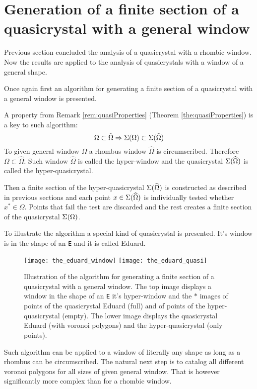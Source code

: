 \documentclass[text.tex]{subfiles}
\begin{document}
\pagestyle{plain}
\section{Generation of a finite section of a quasicrystal with a general window}
Previous section concluded the analysis of a quasicrystal with a rhombic window. Now the results are applied to the analysis of quasicrystals with a window of a general shape. 

Once again first an algorithm for generating a finite section of a quasicrystal with a general window is presented.

A property from Remark \ref{rem:quasiProperties} (Theorem \ref{the:quasiProperties}) is a key to such algorithm:
$$\Omega \subset \tilde{\Omega} \Rightarrow \Sigma(\Omega) \subset \Sigma(\tilde{\Omega})$$
To given general window $\Omega$ a rhombus window $\widehat{\Omega}$ is circumscribed. Therefore $\Omega\subset\widehat{\Omega}$. Such window $\widehat{\Omega}$ is called the hyper-window and the quasicrystal $\Sigma(\widehat{\Omega})$ is called the hyper-quasicrystal. 

Then a finite section of the hyper-quasicrystal $\Sigma(\widehat{\Omega})$ is constructed as described in previous sections and each point $x\in\Sigma(\widehat{\Omega})$ is individually tested whether $x^\ast\in\Omega$. Points that fail the test are discarded and the rest creates a finite section of the quasicrystal $\Sigma(\Omega)$.

To illustrate the algorithm a special kind of quasicrystal is presented. It's window is in the shape of an \texttt{E} and it is called Eduard.
\begin{figure}[h!]
\centering
\texttt{[image: the\_eduard\_window]}
\texttt{[image: the\_eduard\_quasi]}
\caption{Illustration of the algorithm for generating a finite section of a quasicrystal with a general window. The top image displays a window in the shape of an \texttt{E} it's hyper-window and the $\ast$ images of points of the quasicrystal Eduard (full) and of points of the hyper-quasicrystal (empty). The lower image displays the quasicrystal Eduard (with voronoi polygons) and the hyper-quasicrystal (only points).}
\end{figure}

Such algorithm can be applied to a window of literally any shape as long as a rhombus can be circumscribed. The natural next step is to catalog all different voronoi polygons for all sizes of given general window. That is however significantly more complex than for a rhombic window.
\end{document}

